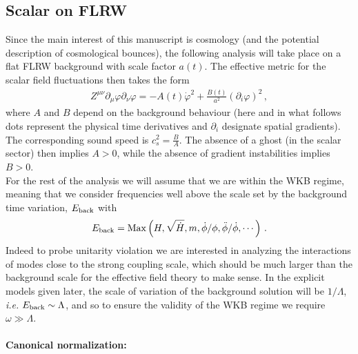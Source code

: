 \documentclass[12pt]{article}
\def\ba{\begin{eqnarray}}
\def\ea{\end{eqnarray}}
\def\({\left(}
\def\){\right)}
\def\ie{{\it i.e. }}
\def\p{\partial}
\def\p{\partial}
\begin{document}
\subsection{Scalar on FLRW}
\label{sec:scalarFLRW}

Since the main interest of this manuscript is cosmology  (and the potential description of cosmological bounces), the following analysis will take place on a flat FLRW background with scale factor $a (t)$. The effective metric for the scalar field fluctuations then takes the form
\ba
\label{eq:Z}
Z^{\mu\nu} \p_\mu \varphi \p_\nu \varphi = - A(t) \dot \varphi^2 + \frac{B(t)}{a^2} (\p_i \varphi)^2\,,
\ea
where $A$ and $B$ depend on the background behaviour (here and in what follows dots represent the physical time derivatives and $\p_i$ designate spatial gradients).
The corresponding sound speed is $c_s^2=\frac{B}{A}$.
The absence of a ghost (in the scalar sector) then implies $A>0$, while the absence of gradient instabilities implies $B>0$. \\

For the rest of the analysis we will assume that we are within the WKB regime, meaning that we consider  frequencies well above the scale set by the background time variation, $E_{\rm back}$ with
\ba
\label{eq:Ebackground2}
E_{\rm back} = {\rm Max}\(H, \sqrt{\dot H}, m,  \dot \phi/ \phi, \ddot \phi / \dot \phi, \cdots \)\,.
\ea
 Indeed to probe unitarity violation we are interested in analyzing the interactions of modes close to the strong coupling scale, which should be much larger than the background scale for the effective field theory to make sense.  In the explicit models given later, the scale of variation of the background solution will be $1/\Lambda$, \ie $E_{\rm back} \sim \Lambda$, and so to ensure the validity of the WKB regime we require $\omega\gg \Lambda$.
\\

\paragraph{Canonical normalization:}
\end{document}
